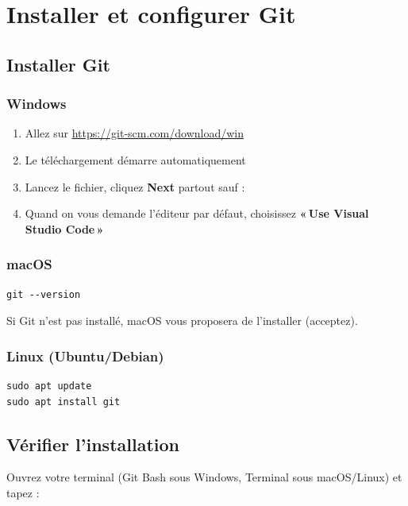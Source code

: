 \documentclass[11pt,a4paper]{article}
\begin{document}
\newpage

\section{Installer et configurer Git}

\subsection{Installer Git}

\subsubsection*{Windows}
\begin{enumerate}[nosep]
    \item Allez sur \url{https://git-scm.com/download/win}
    \item Le téléchargement démarre automatiquement
    \item Lancez le fichier, cliquez \textbf{Next} partout sauf :
    \item Quand on vous demande l'éditeur par défaut, choisissez \textbf{«\,Use Visual Studio Code\,»}
\end{enumerate}

\subsubsection*{macOS}
\begin{lstlisting}
git --version
\end{lstlisting}
Si Git n'est pas installé, macOS vous proposera de l'installer (acceptez).

\subsubsection*{Linux (Ubuntu/Debian)}
\begin{lstlisting}
sudo apt update
sudo apt install git
\end{lstlisting}

\subsection{Vérifier l'installation}

Ouvrez votre terminal (Git Bash sous Windows, Terminal sous macOS/Linux)
et tapez :
\end{document}
